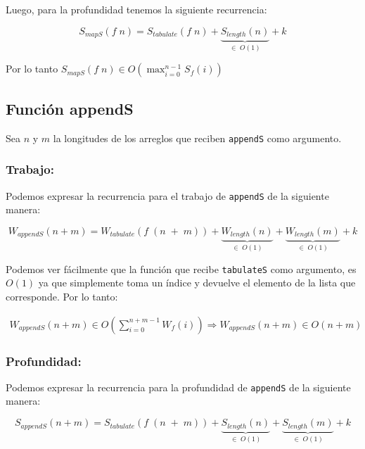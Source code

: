 \documentclass[11pt]{article}
\begin{document}
Luego, para la profundidad tenemos la siguiente recurrencia:

\begin{equation*}
    S_{mapS}(f \; n) = S_{tabulate}(f \; n) + \underbrace{S_{length}(n)}_{\in \; O(1)} + k
\end{equation*} 

Por lo tanto $ S_{mapS}(f \; n) \in O\left(\displaystyle\max_{i=0}^{n - 1}S_f(i)\right) $


\subsection{Función appendS}
Sea $n$ y $m$ la longitudes de los arreglos que reciben \texttt{appendS} como
argumento. 
\subsubsection{Trabajo:}

Podemos expresar la recurrencia para el trabajo de \texttt{appendS} de 
la siguiente manera:

\begin{equation*}
    W_{appendS}(n + m) = W_{tabulate}(f \; (n \; +\; m)) + \underbrace{W_{length}(n)}_{\in \; O(1)}
    + \underbrace{W_{length}(m)}_{\in \; O(1)} + k
\end{equation*}

Podemos ver fácilmente que la función que recibe \texttt{tabulateS} como
argumento, es $O(1)$ ya que simplemente toma un índice y devuelve el 
elemento de la lista que corresponde. Por lo tanto:

\begin{align*}
    W_{appendS}(n + m) \in O\left(\displaystyle\sum_{i=0}^{n + m - 1}W_f(i)\right)
    \Rightarrow W_{appendS}(n + m) \in O(n + m)
\end{align*}

\subsubsection{Profundidad:}
Podemos expresar la recurrencia para la profundidad de \texttt{appendS} de 
la siguiente manera:

\begin{equation*}
    S_{appendS}(n + m) = S_{tabulate}(f \; (n \; +\; m)) + \underbrace{S_{length}(n)}_{\in \; O(1)}
    + \underbrace{S_{length}(m)}_{\in \; O(1)} + k
\end{equation*}
\end{document}
